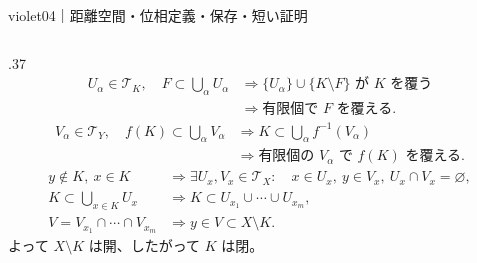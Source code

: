 \begin{sheetframe}[50]{violet}{04｜距離空間・位相}{定義・保存・短い証明}
\begin{columns}[T,onlytextwidth]
\begin{column}{.37\textwidth}
\separator
{}
\[
\begin{aligned}
U_\alpha\in\mathcal T_K,\quad
F\subset\bigcup_\alpha U_\alpha
&\Rightarrow
\{U_\alpha\}\cup\{K\setminus F\}
   \text{ が }K\text{ を覆う}\\
&\Rightarrow
\text{有限個で }F\text{ を覆える}.
\end{aligned}
\]
\[
\begin{aligned}
V_\alpha\in\mathcal T_Y,\quad
f(K)\subset\bigcup_\alpha V_\alpha
&\Rightarrow
K\subset\bigcup_\alpha f^{-1}(V_\alpha)\\
&\Rightarrow
\text{有限個の }V_\alpha\text{ で }f(K)\text{ を覆える}.
\end{aligned}
\]
\[
\begin{aligned}
y\notin K,\ x\in K
&\Rightarrow
\exists U_x,V_x\in\mathcal T_X:\quad
x\in U_x,\ y\in V_x,\ U_x\cap V_x=\varnothing,\\
K\subset\bigcup_{x\in K}U_x
&\Rightarrow
K\subset U_{x_1}\cup\cdots\cup U_{x_m},\\
V=V_{x_1}\cap\cdots\cap V_{x_m}
&\Rightarrow
y\in V\subset X\setminus K.
\end{aligned}
\]
よって $X\setminus K$ は開、したがって $K$ は閉。
\end{column}


\end{columns}
\end{sheetframe}
